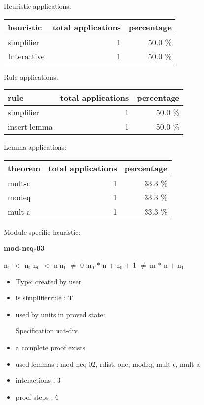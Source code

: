 \documentclass[a4paper]{article}
\begin{document}
\medskip


Heuristic applications:

\begin{supertabular}{l|r|r}
heuristic	& total applications & percentage \\ \hline
simplifier & 1 & 50.0 \% \\
Interactive & 1 & 50.0 \% \\

\end{supertabular}

Rule applications:

\begin{supertabular}{l|r|r}
rule	        & total applications & percentage \\ \hline
simplifier & 1 & 50.0 \% \\
insert lemma & 1 & 50.0 \% \\

\end{supertabular}

Lemma applications:

\begin{supertabular}{l|r|r}
theorem	        & total applications & percentage \\ \hline
mult-c & 1 & 33.3 \% \\
modeq & 1 & 33.3 \% \\
mult-a & 1 & 33.3 \% \\

\end{supertabular}

Module specific heuristic:

\pagebreak

{\LARGE\bf mod-neq-03}\label{lemma-mod-neq-03}

\medskip

 \Fol $\mbox{n}_{1}$ $<$ $\mbox{n}_{0}$ \And $\mbox{n}_{0}$ $<$ n \And $\mbox{n}_{1}$ $\neq$ 0 \Imp $\mbox{m}_{0}$ $*$ n + $\mbox{n}_{0}$ + 1 $\neq$ m $*$ n + $\mbox{n}_{1}$

\begin{itemize}

\item Type: created by user

\item is simplifierrule : T
\item used by units in proved state:

Specification nat-div
\item       a complete proof exists
\item       used lemmas  : mod-neq-02, rdist, one, modeq, mult-c, mult-a
\item       interactions : 3
\item       proof steps  : 6
\end{itemize}
\end{document}
